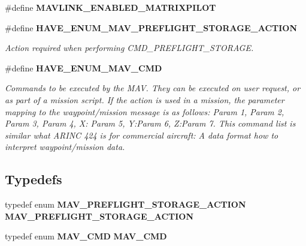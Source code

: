 \begin{DoxyCompactItemize}
\item 
\#define \textbf{ M\+A\+V\+L\+I\+N\+K\+\_\+\+E\+N\+A\+B\+L\+E\+D\+\_\+\+M\+A\+T\+R\+I\+X\+P\+I\+L\+OT}
\item 
\#define \textbf{ H\+A\+V\+E\+\_\+\+E\+N\+U\+M\+\_\+\+M\+A\+V\+\_\+\+P\+R\+E\+F\+L\+I\+G\+H\+T\+\_\+\+S\+T\+O\+R\+A\+G\+E\+\_\+\+A\+C\+T\+I\+ON}
\begin{DoxyCompactList}\small\item\em Action required when performing C\+M\+D\+\_\+\+P\+R\+E\+F\+L\+I\+G\+H\+T\+\_\+\+S\+T\+O\+R\+A\+GE. \end{DoxyCompactList}\item 
\#define \textbf{ H\+A\+V\+E\+\_\+\+E\+N\+U\+M\+\_\+\+M\+A\+V\+\_\+\+C\+MD}
\begin{DoxyCompactList}\small\item\em Commands to be executed by the M\+AV. They can be executed on user request, or as part of a mission script. If the action is used in a mission, the parameter mapping to the waypoint/mission message is as follows\+: Param 1, Param 2, Param 3, Param 4, X\+: Param 5, Y\+:Param 6, Z\+:Param 7. This command list is similar what A\+R\+I\+NC 424 is for commercial aircraft\+: A data format how to interpret waypoint/mission data. \end{DoxyCompactList}\end{DoxyCompactItemize}
\subsection*{Typedefs}
\begin{DoxyCompactItemize}
\item 
typedef enum \textbf{ M\+A\+V\+\_\+\+P\+R\+E\+F\+L\+I\+G\+H\+T\+\_\+\+S\+T\+O\+R\+A\+G\+E\+\_\+\+A\+C\+T\+I\+ON} \textbf{ M\+A\+V\+\_\+\+P\+R\+E\+F\+L\+I\+G\+H\+T\+\_\+\+S\+T\+O\+R\+A\+G\+E\+\_\+\+A\+C\+T\+I\+ON}
\item 
typedef enum \textbf{ M\+A\+V\+\_\+\+C\+MD} \textbf{ M\+A\+V\+\_\+\+C\+MD}
\end{DoxyCompactItemize}
